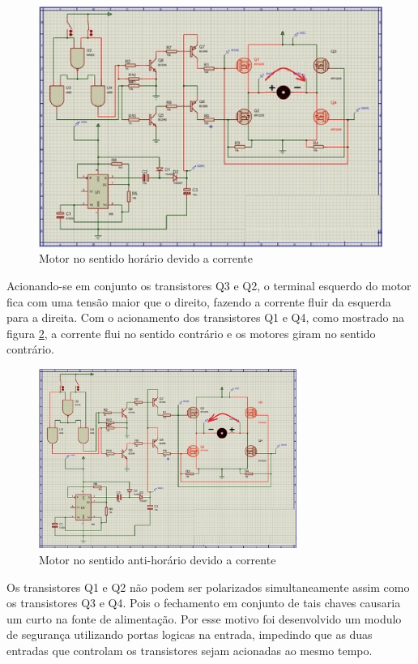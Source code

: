 \begin{figure}[!htb]
	\centering
	\includegraphics[keepaspectratio=true,scale=0.5]{figuras/referencialteorico/figurax_2.eps}
	\caption{Motor no sentido horário devido a corrente}
	\label{fig:motor_clockwise}
\end{figure}

Acionando-se em conjunto os transistores Q3 e Q2, o terminal esquerdo do motor fica com uma tensão maior que o direito, fazendo a corrente fluir da esquerda para a direita. Com o acionamento dos transistores Q1 e Q4, como mostrado na figura \ref{fig:motor_counterclockwise}, a corrente flui no sentido contrário e os motores giram no sentido contrário.

\begin{figure}[!htb]
	\centering
	\includegraphics[width = 0.75\textwidth]{figuras/referencialteorico/figurax_3.eps}
	\caption{Motor no sentido anti-horário devido a corrente}
	\label{fig:motor_counterclockwise}
\end{figure}

Os transistores Q1 e Q2 não podem ser polarizados simultaneamente assim como os transistores Q3 e Q4. Pois o fechamento em conjunto de tais chaves causaria um curto na fonte de alimentação. Por esse motivo foi desenvolvido um modulo de segurança utilizando portas logicas na entrada, impedindo que as duas entradas que controlam os transistores sejam acionadas ao mesmo tempo.
